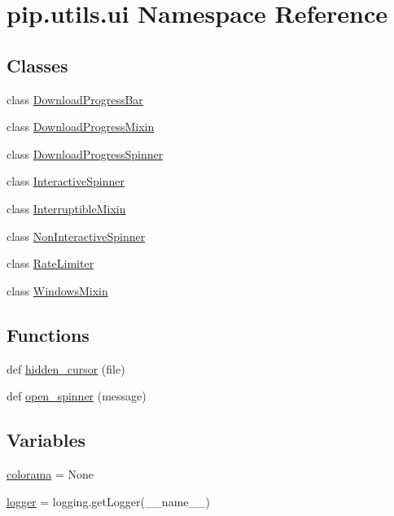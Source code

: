 \hypertarget{namespacepip_1_1utils_1_1ui}{}\section{pip.\+utils.\+ui Namespace Reference}
\label{namespacepip_1_1utils_1_1ui}
\subsection*{Classes}
\begin{DoxyCompactItemize}
\item 
class \hyperlink{classpip_1_1utils_1_1ui_1_1_download_progress_bar}{Download\+Progress\+Bar}
\item 
class \hyperlink{classpip_1_1utils_1_1ui_1_1_download_progress_mixin}{Download\+Progress\+Mixin}
\item 
class \hyperlink{classpip_1_1utils_1_1ui_1_1_download_progress_spinner}{Download\+Progress\+Spinner}
\item 
class \hyperlink{classpip_1_1utils_1_1ui_1_1_interactive_spinner}{Interactive\+Spinner}
\item 
class \hyperlink{classpip_1_1utils_1_1ui_1_1_interruptible_mixin}{Interruptible\+Mixin}
\item 
class \hyperlink{classpip_1_1utils_1_1ui_1_1_non_interactive_spinner}{Non\+Interactive\+Spinner}
\item 
class \hyperlink{classpip_1_1utils_1_1ui_1_1_rate_limiter}{Rate\+Limiter}
\item 
class \hyperlink{classpip_1_1utils_1_1ui_1_1_windows_mixin}{Windows\+Mixin}
\end{DoxyCompactItemize}
\subsection*{Functions}
\begin{DoxyCompactItemize}
\item 
def \hyperlink{namespacepip_1_1utils_1_1ui_ac333eaab9e9daddb02ebe7728f545a40}{hidden\+\_\+cursor} (file)
\item 
def \hyperlink{namespacepip_1_1utils_1_1ui_a9ddc37f1c2186264ca83fac1a51a5a58}{open\+\_\+spinner} (message)
\end{DoxyCompactItemize}
\subsection*{Variables}
\begin{DoxyCompactItemize}
\item 
\hyperlink{namespacepip_1_1utils_1_1ui_af0f636fbda629cbdcaf91ed33a57153b}{colorama} = None
\item 
\hyperlink{namespacepip_1_1utils_1_1ui_a002c407c13dfcbfe8bb046fe8782d01f}{logger} = logging.\+get\+Logger(\+\_\+\+\_\+name\+\_\+\+\_\+)
\end{DoxyCompactItemize}


